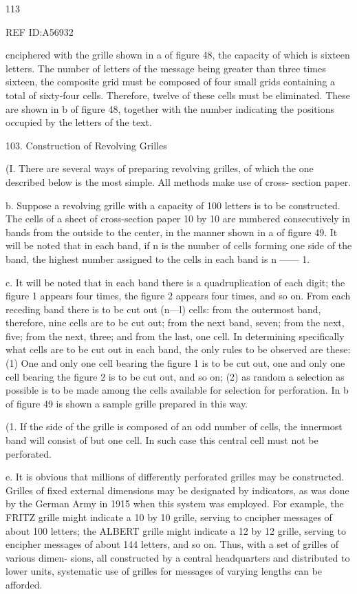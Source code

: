 113

REF ID:A56932

cnciphered with the grille shown in a of ﬁgure 48, the capacity of which
is sixteen letters. The number of letters of the message being greater than
three times sixteen, the composite grid must be composed of four small
grids containing a total of sixty-four cells. Therefore, twelve of these
cells must be eliminated. These are shown in b of ﬁgure 48, together with
the number indicating the positions occupied by the letters of the text.

103. Construction of Revolving Grilles

(I. There are several ways of preparing revolving grilles, of which the
one described below is the most simple. All methods make use of cross-
section paper.

b. Suppose a revolving grille with a capacity of 100 letters is to be
constructed. The cells of a sheet of cross-section paper 10 by 10 are
numbered consecutively in bands from the outside to the center, in the
manner shown in a of ﬁgure 49. It will be noted that in each band, if n
is the number of cells forming one side of the band, the highest number
assigned to the cells in each band is n —— 1.

c. It will be noted that in each band there is a quadruplication of
each digit; the ﬁgure 1 appears four times, the ﬁgure 2 appears four
times, and so on. From each receding band there is to be cut out
(n—l) cells: from the outermost band, therefore, nine cells are to be
cut out; from the next band, seven; from the next, ﬁve; from the next,
three; and from the last, one cell. In determining speciﬁcally what cells
are to be cut out in each band, the only rules to be observed are these:
(1) One and only one cell bearing the ﬁgure 1 is to be cut out, one
and only one cell bearing the ﬁgure 2 is to be cut out, and so on; (2) as
random a selection as possible is to be made among the cells available
for selection for perforation. In b of ﬁgure 49 is shown a sample grille
prepared in this way.

(1. If the side of the grille is composed of an odd number of cells, the
innermost band will consist of but one cell. In such case this central cell
must not be perforated.

e. It is obvious that millions of differently perforated grilles may be
constructed. Grilles of ﬁxed external dimensions may be designated by
indicators, as was done by the German Army in 1915 when this system
was employed. For example, the FRITZ grille might indicate a 10 by 10
grille, serving to cncipher messages of about 100 letters; the ALBERT
grille might indicate a 12 by 12 grille, serving to encipher messages of
about 144 letters, and so on. Thus, with a set of grilles of various dimen-
sions, all constructed by a central headquarters and distributed to lower
units, systematic use of grilles for messages of varying lengths can be
afforded.

